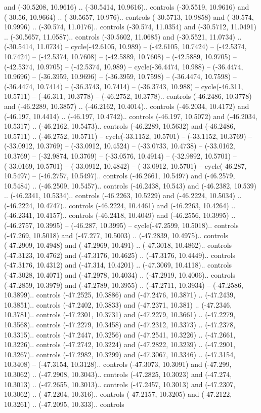 \begin{scope}[shift={(2.5552, 9.9912)}]
\begin{scope}[shift={(48.1654, -14.8546)}]
and (-30.5208, 10.9616) .. (-30.5414, 10.9616).. controls (-30.5519, 10.9616) and (-30.56, 10.9664) .. (-30.5657, 10.976).. controls (-30.5713, 10.9858) and (-30.574, 10.9996) .. (-30.574, 11.0176).. controls (-30.574, 11.0354) and (-30.5712, 11.0491) .. (-30.5657, 11.0587).. controls (-30.5602, 11.0685) and (-30.5521, 11.0734) .. (-30.5414, 11.0734) -- cycle(-42.6105, 10.989) -- (-42.6105, 10.7424) -- (-42.5374, 10.7424) -- (-42.5374, 10.7608) -- (-42.5889, 10.7608) -- (-42.5889, 10.9705) -- (-42.5374, 10.9705) -- (-42.5374, 10.989) -- cycle(-36.4474, 10.988) -- (-36.4474, 10.9696) -- (-36.3959, 10.9696) -- (-36.3959, 10.7598) -- (-36.4474, 10.7598) -- (-36.4474, 10.7414) -- (-36.3743, 10.7414) -- (-36.3743, 10.988) -- cycle(-46.311, 10.5711) -- (-46.311, 10.3778) -- (-46.2752, 10.3778).. controls (-46.2486, 10.3778) and (-46.2289, 10.3857) .. (-46.2162, 10.4014).. controls (-46.2034, 10.4172) and (-46.197, 10.4414) .. (-46.197, 10.4742).. controls (-46.197, 10.5072) and (-46.2034, 10.5317) .. (-46.2162, 10.5473).. controls (-46.2289, 10.5632) and (-46.2486, 10.5711) .. (-46.2752, 10.5711) -- cycle(-33.1152, 10.5701) -- (-33.1152, 10.3769) -- (-33.0912, 10.3769) -- (-33.0912, 10.4524) -- (-33.0733, 10.4738) -- (-33.0162, 10.3769) -- (-32.9874, 10.3769) -- (-33.0576, 10.4914) -- (-32.9892, 10.5701) -- (-33.0169, 10.5701) -- (-33.0912, 10.4842) -- (-33.0912, 10.5701) -- cycle(-46.287, 10.5497) -- (-46.2757, 10.5497).. controls (-46.2661, 10.5497) and (-46.2579, 10.5484) .. (-46.2509, 10.5457).. controls (-46.2438, 10.543) and (-46.2382, 10.539) .. (-46.2341, 10.5334).. controls (-46.2263, 10.5229) and (-46.2224, 10.5034) .. (-46.2224, 10.4747).. controls (-46.2224, 10.4461) and (-46.2263, 10.4264) .. (-46.2341, 10.4157).. controls (-46.2418, 10.4049) and (-46.2556, 10.3995) .. (-46.2757, 10.3995) -- (-46.287, 10.3995) -- cycle(-47.2599, 10.5018).. controls (-47.269, 10.5018) and (-47.277, 10.5003) .. (-47.2839, 10.4975).. controls (-47.2909, 10.4948) and (-47.2969, 10.491) .. (-47.3018, 10.4862).. controls (-47.3123, 10.4762) and (-47.3176, 10.4625) .. (-47.3176, 10.4449).. controls (-47.3176, 10.4312) and (-47.314, 10.4201) .. (-47.3069, 10.4118).. controls (-47.3028, 10.4071) and (-47.2978, 10.4034) .. (-47.2919, 10.4006).. controls (-47.2859, 10.3979) and (-47.2789, 10.3955) .. (-47.2711, 10.3934) -- (-47.2586, 10.3899).. controls (-47.2525, 10.3886) and (-47.2476, 10.3871) .. (-47.2439, 10.3851).. controls (-47.2402, 10.3833) and (-47.2371, 10.381) .. (-47.2346, 10.3781).. controls (-47.2301, 10.3731) and (-47.2279, 10.3661) .. (-47.2279, 10.3568).. controls (-47.2279, 10.3458) and (-47.2312, 10.3373) .. (-47.2378, 10.3315).. controls (-47.2447, 10.3256) and (-47.2541, 10.3226) .. (-47.2661, 10.3226).. controls (-47.2742, 10.3224) and (-47.2822, 10.3239) .. (-47.2901, 10.3267).. controls (-47.2982, 10.3299) and (-47.3067, 10.3346) .. (-47.3154, 10.3408) -- (-47.3154, 10.3128).. controls (-47.3073, 10.3091) and (-47.299, 10.3062) .. (-47.2908, 10.3043).. controls (-47.2825, 10.3023) and (-47.274, 10.3013) .. (-47.2655, 10.3013).. controls (-47.2457, 10.3013) and (-47.2307, 10.3062) .. (-47.2204, 10.316).. controls (-47.2157, 10.3205) and (-47.2122, 10.3261) .. (-47.2095, 10.333).. controls 
\end{scope}
\end{scope}
